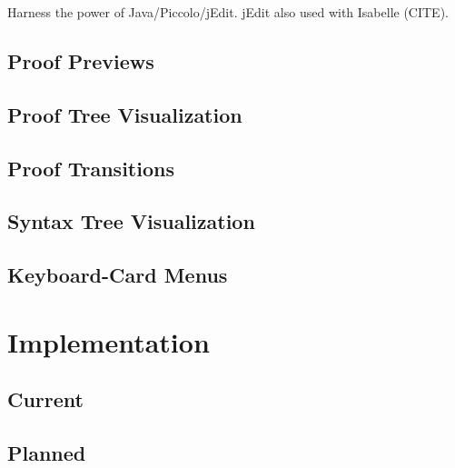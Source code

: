 \documentclass[11pt]{amsart}
\begin{document}
Harness the power of Java/Piccolo/jEdit.  jEdit also used with Isabelle (CITE).

\subsection{Proof Previews}

\subsection{Proof Tree Visualization}

\subsection{Proof Transitions}

\subsection{Syntax Tree Visualization}

\subsection{Keyboard-Card Menus}

\section{Implementation}

\subsection{Current}

\subsection{Planned}
\end{document}
